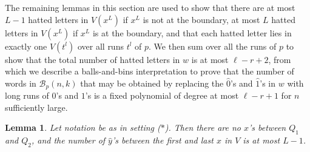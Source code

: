 \documentclass[11pt]{amsart}
\newtheorem{lemma}[theorem]{Lemma}
\newtheorem{ex}[theorem]{Example}
\newcommand{\settingstar}{{\normalfont(\hyperref[setting_star]{$\ast$})}}
\newcommand{\hatted}[1]{\widehat{#1}}
\begin{document}
The remaining lemmas in this section are used to show that there are at most $L-1$ hatted letters in $V(x^L)$ if $x^L$ is not at the boundary, at most $L$ hatted letters in $V(x^L)$ if $x^L$ is at the boundary, and that each hatted letter lies in exactly one $V(t^l)$ over all runs $t^l$ of $p$. We then sum over all the runs of $p$ to show that the total number of hatted letters in $w$ is at most $\ell-r+2$, from which we describe a balls-and-bins interpretation \cite[Section 1.9]{stanley_book} to prove that the number of words in $\mathcal{B}_p(n,k)$ that may be obtained by replacing the $\hatted{0}$'s and $\hatted{1}$'s in $w$ with long runs of $0$'s and $1$'s is a fixed polynomial of degree at most $\ell-r+1$ for $n$ sufficiently large.



\begin{lemma}\label{at_most_L_minus_1}
    Let notation be as in setting \settingstar. Then there are no $\hatted{x}$'s between $Q_1$ and $Q_2$, and the number of $\hatted{y}$'s between the first and last $x$ in $V$ is at most $L-1$.
\end{lemma}
\end{document}
